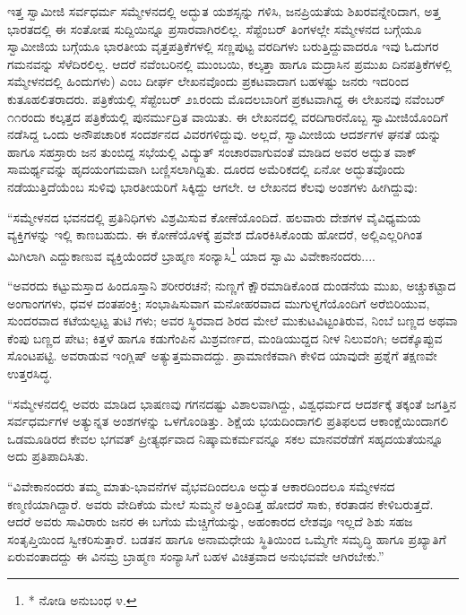 ಇತ್ತ ಸ್ವಾಮೀಜಿ ಸರ್ವಧರ್ಮ ಸಮ್ಮೇಳನದಲ್ಲಿ ಅದ್ಭುತ ಯಶಸ್ಸನ್ನು ಗಳಿಸಿ, ಜನಪ್ರಿಯತೆಯ ಶಿಖರವನ್ನೇರಿದಾಗ, ಅತ್ತ ಭಾರತದಲ್ಲಿ ಈ ಸಂತೋಷ ಸುದ್ದಿಯಿನ್ನೂ ಪ್ರಸಾರವಾಗಿರಲಿಲ್ಲ. ಸೆಪ್ಟೆಂಬರ್ ತಿಂಗಳಲ್ಲೇ ಸಮ್ಮೇಳನದ ಬಗ್ಗೆಯೂ ಸ್ವಾಮೀಜಿಯ ಬಗ್ಗೆಯೂ ಭಾರತೀಯ ವೃತ್ತಪತ್ರಿಕೆಗಳಲ್ಲಿ ಸಣ್ಣಪುಟ್ಟ ವರದಿಗಳು ಬರುತ್ತಿದ್ದುವಾದರೂ ಇವು ಓದುಗರ ಗಮನವನ್ನು ಸೆಳೆದಿರಲಿಲ್ಲ. ಆದರೆ ನವೆಂಬರಿನಲ್ಲಿ ಮುಂಬಯಿ, ಕಲ್ಕತ್ತಾ ಹಾಗೂ ಮದ್ರಾಸಿನ ಪ್ರಮುಖ ದಿನಪತ್ರಿಕೆಗಳಲ್ಲಿ ಸಮ್ಮೇಳನದಲ್ಲಿ ಹಿಂದುಗಳು) ಎಂಬ ದೀರ್ಘ ಲೇಖನವೊಂದು ಪ್ರಕಟವಾದಾಗ ಬಹಳಷ್ಟು ಜನರು ಇದರಿಂದ ಕುತೂಹಲಿತರಾದರು.  ಪತ್ರಿಕೆಯಲ್ಲಿ ಸೆಪ್ಟೆಂಬರ್ ೨೩ರಂದು ಮೊದಲಬಾರಿಗೆ ಪ್ರಕಟವಾಗಿದ್ದ ಈ ಲೇಖನವು ನವೆಂಬರ್ ೧೧ರಂದು ಕಲ್ಕತ್ತದ  ಪತ್ರಿಕೆಯಲ್ಲಿ ಪುನರ್ಮುದ್ರಿತ ವಾಯಿತು. ಈ ಲೇಖನದಲ್ಲಿ ವರದಿಗಾರನೊಬ್ಬ ಸ್ವಾಮೀಜಿಯೊಂದಿಗೆ ನಡೆಸಿದ್ದ ಒಂದು ಅನೌಪಚಾರಿಕ ಸಂದರ್ಶನದ ವಿವರಗಳಿದ್ದುವು. ಅಲ್ಲದೆ, ಸ್ವಾಮೀಜಿಯ ಆದರ್ಶಗಳ ಘನತೆ ಯನ್ನು ಹಾಗೂ ಸಹಸ್ರಾರು ಜನ ತುಂಬಿದ್ದ ಸಭೆಯಲ್ಲಿ ವಿದ್ಯುತ್ ಸಂಚಾರವಾಗುವಂತೆ ಮಾಡಿದ ಅವರ ಅದ್ಭುತ ವಾಕ್​ಸಾಮರ್ಥ್ಯವನ್ನು ಹೃದಯಂಗಮವಾಗಿ ಬಣ್ಣಿಸಲಾಗಿದ್ದಿತು. ದೂರದ ಅಮೆರಿಕದಲ್ಲಿ ಏನೋ ಅದ್ಭುತವೊಂದು ನಡೆಯುತ್ತಿದೆಯೆಂಬ ಸುಳಿವು ಭಾರತೀಯರಿಗೆ ಸಿಕ್ಕಿದ್ದು ಆಗಲೇ. ಆ ಲೇಖನದ ಕೆಲವು ಅಂಶಗಳು ಹೀಗಿದ್ದುವು:

“ಸಮ್ಮೇಳನದ ಭವನದಲ್ಲಿ ಪ್ರತಿನಿಧಿಗಳು ವಿಶ್ರಮಿಸುವ ಕೋಣೆಯೊಂದಿದೆ. ಹಲವಾರು ದೇಶಗಳ ವೈವಿಧ್ಯಮಯ ವ್ಯಕ್ತಿಗಳನ್ನು ಇಲ್ಲಿ ಕಾಣಬಹುದು. ಈ ಕೋಣೆಯೊಳಕ್ಕೆ ಪ್ರವೇಶ ದೊರಕಿಸಿಕೊಂಡು ಹೋದರೆ, ಅಲ್ಲಿಎಲ್ಲರಿಗಿಂತ ಮಿಗಿಲಾಗಿ ಎದ್ದುಕಾಣುವ ವ್ಯಕ್ತಿಯೆಂದರೆ ಬ್ರಾಹ್ಮಣ ಸಂನ್ಯಾಸಿ\footnote{* ನೋಡಿ ಅನುಬಂಧ ೪.} ಯಾದ ಸ್ವಾಮಿ ವಿವೇಕಾನಂದರು....

“ಅವರದು ಕಟ್ಟುಮಸ್ತಾದ ಹಿಂದೂಸ್ತಾನಿ ಶರೀರರಚನೆ; ನುಣ್ಣಗೆ ಕ್ಷೌರಮಾಡಿಕೊಂಡ ದುಂಡನೆಯ ಮುಖ, ಅಚ್ಚುಕಟ್ಟಾದ ಅಂಗಾಂಗಗಳು, ಧವಳ ದಂತಪಂಕ್ತಿ; ಸಂಭಾಷಿಸುವಾಗ ಮನೋಹರವಾದ ಮುಗುಳ್ನಗೆಯೊಂದಿಗೆ ಅರೆಬಿರಿಯುವ, ಸುಂದರವಾದ ಕಟೆಯಲ್ಪಟ್ಟ ತುಟಿ ಗಳು; ಅವರ ಸ್ಥಿರವಾದ ಶಿರದ ಮೇಲೆ ಮುಕುಟವಿಟ್ಟಂತಿರುವ, ನಿಂಬೆ ಬಣ್ಣದ ಅಥವಾ ಕೆಂಪು ಬಣ್ಣದ ಪೇಟ; ಕಿತ್ತಳೆ ಹಾಗೂ ಕಡುಗೆಂಪಿನ ಮಿಶ್ರವರ್ಣದ, ಮಂಡಿಯುದ್ದದ ನೀಳ ನಿಲುವಂಗಿ; ಅದಕ್ಕೊಪ್ಪುವ ಸೊಂಟಪಟ್ಟಿ. ಅವರಾಡುವ ಇಂಗ್ಲಿಷ್ ಅತ್ಯುತ್ತಮವಾದದ್ದು. ಪ್ರಾಮಾಣಿಕವಾಗಿ ಕೇಳಿದ ಯಾವುದೇ ಪ್ರಶ್ನೆಗೆ ತಕ್ಷಣವೇ ಉತ್ತರಸಿದ್ಧ.

“ಸಮ್ಮೇಳನದಲ್ಲಿ ಅವರು ಮಾಡಿದ ಭಾಷಣವು ಗಗನದಷ್ಟು ವಿಶಾಲವಾಗಿದ್ದು, ವಿಶ್ವಧರ್ಮದ ಆದರ್ಶಕ್ಕೆ ತಕ್ಕಂತೆ ಜಗತ್ತಿನ ಸರ್ವಧರ್ಮಗಳ ಅತ್ಯುನ್ನತ ಅಂಶಗಳನ್ನು ಒಳಗೊಂಡಿತ್ತು. ಶಿಕ್ಷೆಯ ಭಯದಿಂದಾಗಲಿ ಪ್ರತಿಫಲದ ಆಕಾಂಕ್ಷೆಯಿಂದಾಗಲಿ ಒಡಮೂಡಿರದ ಕೇವಲ ಭಗವತ್ ಪ್ರೀತ್ಯರ್ಥವಾದ ನಿಷ್ಕಾಮಕರ್ಮವನ್ನೂ ಸಕಲ ಮಾನವರೆಡೆಗೆ ಸಹೃದಯತೆಯನ್ನೂ ಅದು ಪ್ರತಿಪಾದಿಸಿತು.

“ವಿವೇಕಾನಂದರು ತಮ್ಮ ಮಾತು-ಭಾವನೆಗಳ ವೈಭವದಿಂದಲೂ ಅದ್ಭುತ ಆಕಾರದಿಂದಲೂ ಸಮ್ಮೇಳನದ ಕಣ್ಮಣಿಯಾಗಿದ್ದಾರೆ. ಅವರು ವೇದಿಕೆಯ ಮೇಲೆ ಸುಮ್ಮನೆ ಅತ್ತಿಂದಿತ್ತ ಹೋದರೆ ಸಾಕು, ಕರತಾಡನ ಕೇಳಿಬರುತ್ತದೆ. ಆದರೆ ಅವರು ಸಾವಿರಾರು ಜನರ ಈ ಬಗೆಯ ಮೆಚ್ಚಿಗೆಯನ್ನು, ಅಹಂಕಾರದ ಲೇಶವೂ ಇಲ್ಲದೆ ಶಿಶು ಸಹಜ ಸಂತೃಪ್ತಿಯಿಂದ ಸ್ವೀಕರಿಸುತ್ತಾರೆ. ಬಡತನ ಹಾಗೂ ಅನಾಮಧೇಯ ಸ್ಥಿತಿಯಿಂದ ಒಮ್ಮೆಗೇ ಸಮೃದ್ಧಿ ಹಾಗೂ ಪ್ರಖ್ಯಾತಿಗೆ ಏರುವಂತಾದದ್ದು ಈ ವಿನಮ್ರ ಬ್ರಾಹ್ಮಣ ಸಂನ್ಯಾಸಿಗೆ ಬಹಳ ವಿಚಿತ್ರವಾದ ಅನುಭವವೇ ಆಗಿರಬೇಕು.”

